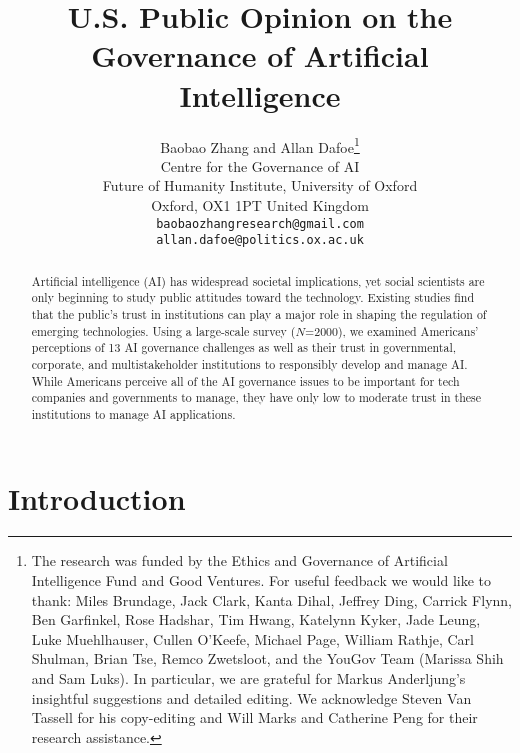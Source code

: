 \documentclass{article}
\begin{document}
\title{U.S. Public Opinion on the Governance of Artificial Intelligence}

\author{
 Baobao Zhang and Allan Dafoe\thanks{The research was funded by the Ethics and Governance of Artificial Intelligence Fund and Good Ventures. For useful feedback we would like to thank: Miles Brundage, Jack Clark, Kanta Dihal, Jeffrey Ding, Carrick Flynn, Ben Garfinkel, Rose Hadshar, Tim Hwang, Katelynn Kyker, Jade Leung, Luke Muehlhauser, Cullen O’Keefe, Michael Page, William Rathje, Carl Shulman, Brian Tse, Remco Zwetsloot, and the YouGov Team (Marissa Shih and Sam Luks). In particular, we are grateful for Markus Anderljung’s insightful suggestions and detailed editing. We acknowledge Steven Van Tassell for his copy-editing and Will Marks and Catherine Peng for their research assistance.} \\
Centre for the Governance of AI\\
Future of Humanity Institute, University of Oxford\\
Oxford, OX1 1PT United Kingdom \\
\texttt{baobaozhangresearch@gmail.com} \\
\texttt{allan.dafoe@politics.ox.ac.uk} \\
}

\maketitle

\begin{abstract}
Artificial intelligence (AI) has widespread societal implications, yet social scientists are only beginning to study public attitudes toward the technology. Existing studies find that the public's trust in institutions can play a major role in shaping the regulation of emerging technologies. Using a large-scale survey ($N$=2000), we examined Americans' perceptions of 13 AI governance challenges as well as their trust in governmental, corporate, and multistakeholder institutions to responsibly develop and manage AI. While Americans perceive all of the AI governance issues to be important for tech companies and governments to manage, they have only low to moderate trust in these institutions to manage AI applications. 
\end{abstract}

\section{Introduction}
\end{document}
